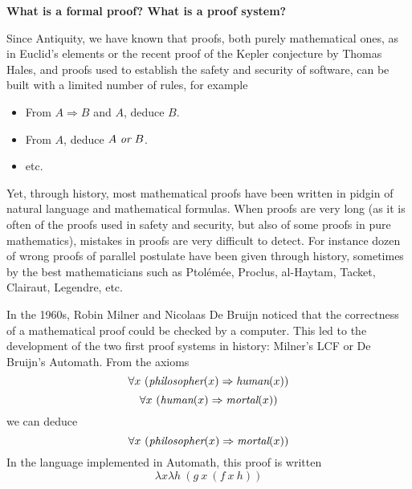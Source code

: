\pagebreak
\begin{framed}
  \begin{center}
    {\bf \Large What is a formal proof? What is a proof system?}
    \end{center}
        
Since Antiquity, we have known that
proofs, both purely mathematical ones, as in Euclid's elements or the
recent proof of the Kepler conjecture by Thomas Hales, and proofs used
to establish the safety and security of software, can be built with a
limited number of rules, for example
\begin{itemize}
\item From $A \Rightarrow B$ and $A$, deduce $B$.
\item From $A$, deduce $A~\mbox{\it or}~B$.
\item etc.
\end{itemize}
Yet, through history, most mathematical proofs have been written in
pidgin of natural language and mathematical formulas. When proofs are
very long (as it is often of the proofs used in safety and security,
but also of some proofs in pure mathematics), mistakes in proofs are
very difficult to detect. For instance dozen of wrong proofs of
parallel postulate have been given through history, sometimes by the
best mathematicians such as Ptolémée, Proclus, al-Haytam, Tacket,
Clairaut, Legendre, etc.

In the 1960s, Robin Milner and Nicolaas De Bruijn noticed that the
correctness of a mathematical proof could be checked by a
computer. This led to the development of the two first proof systems
in history: Milner's LCF or De Bruijn's Automath.  From
the axioms
$$\forall x~(\mbox{\em philosopher}(x) \Rightarrow \mbox{\em human}(x))$$
$$\forall x~(\mbox{\em human}(x) \Rightarrow \mbox{\em mortal}(x))$$
we can deduce
$$\forall x~(\mbox{\em philosopher}(x) \Rightarrow \mbox{\em mortal}(x))$$
In the language implemented in Automath, this proof is written
$$\lambda x \lambda h~(g~x~(f~x~h))$$
\end{framed}

